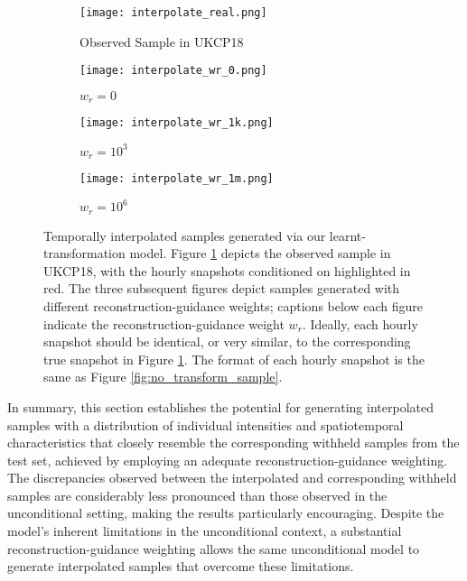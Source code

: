 \documentclass[ oneside,%
                    author={George Herbert},
                    degree={MSci},
                     title={Diffusion Models for Time-Evolving Precipitation Fields},
                  subtitle={}]{dissertation}
\begin{document}
\begin{figure}[htbp]
      \centering
      \begin{subfigure}{\textwidth}
            \texttt{[image: interpolate\_real.png]}
            \caption{Observed Sample in UKCP18}
            \label{fig:interpolate_sample_real}
      \end{subfigure}
      \begin{subfigure}{\textwidth}
            \texttt{[image: interpolate\_wr\_0.png]}
            \caption{$w_r=0$}
            \label{fig:interpolate_sample_wr_0}
      \end{subfigure}
      \begin{subfigure}{\textwidth}
            \texttt{[image: interpolate\_wr\_1k.png]}
            \caption{$w_r=10^3$}
            \label{fig:interpolate_sample_wr_1k}
      \end{subfigure}
      \begin{subfigure}{\textwidth}
            \texttt{[image: interpolate\_wr\_1m.png]}
            \caption{$w_r=10^6$}
            \label{fig:interpolate_sample_wr_1m}
      \end{subfigure}
      \caption{Temporally interpolated samples generated via our learnt-transformation model. Figure \ref{fig:interpolate_sample_real} depicts the observed sample in UKCP18, with the hourly snapshots conditioned on highlighted in red. The three subsequent figures depict samples generated with different reconstruction-guidance weights; captions below each figure indicate the reconstruction-guidance weight $w_r$. Ideally, each hourly snapshot should be identical, or very similar, to the corresponding true snapshot in Figure \ref{fig:interpolate_sample_real}. The format of each hourly snapshot is the same as Figure \ref{fig:no_transform_sample}.}
      \label{fig:interpolate_sample}
\end{figure}

In summary, this section establishes the potential for generating interpolated samples with a distribution of individual intensities and spatiotemporal characteristics that closely resemble the corresponding withheld samples from the test set, achieved by employing an adequate reconstruction-guidance weighting. The discrepancies observed between the interpolated and corresponding withheld samples are considerably less pronounced than those observed in the unconditional setting, making the results particularly encouraging. Despite the model's inherent limitations in the unconditional context, a substantial reconstruction-guidance weighting allows the same unconditional model to generate interpolated samples that overcome these limitations.
\end{document}
